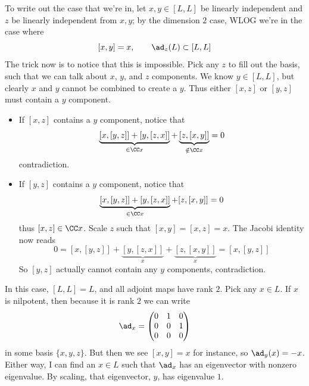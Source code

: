 \documentclass[11pt, headheight=30pt]{scrartcl}
\begin{document}
To write out the case that we're in, let $x,y \in [L,L]$ be linearly independent
and $z$ be linearly independent from $x,y$; by the dimension $2$ case,
WLOG we're in the case where
\[
    [x,y] = x, \qquad \ad_z(L) \subset [L,L]
\]
The trick now is to notice that this is impossible. Pick any $z$ to fill out
the basis, such that we can talk about $x$, $y$, and $z$ components.
We know $y\in [L,L]$, but clearly $x$ and $y$ cannot be
combined to create a $y$. Thus either $[x,z]$ or $[y,z]$ must contain
a $y$ component.
\begin{itemize}
    \item If $[x,z]$ contains a $y$ component, notice that
    \[
        \underbrace{[x, [y,z]] + [y, [z,x]]}_{\in \CC x} + \underbrace{[z, [x,y]]}_{\notin \CC x} = 0
    \]
    contradiction.
    \item If $[y,z]$ contains a $y$ component, notice that
    \[
        \underbrace{[x,[y,z]] + [y, [z,x]]}_{\in \CC x} + [z, [x,y]] = 0
    \]
    thus $[x,z]\in \CC x$. Scale $z$ such that $[x,y] = [x,z] = x$.
    The Jacobi identity now reads
    \[
        0 = [x, [y,z]] + \underbrace{[y, [z,x]]}_x + \underbrace{[z, [x,y]]}_x = [x, [y,z]]  
    \]
    So $[y,z]$ actually cannot contain any $y$ components, contradiction.
\end{itemize}


\begin{rcase*}
\end{rcase*}

In this case, $[L,L] = L$, and all adjoint maps
have rank $2$. Pick any $x\in L$. If $x$ is nilpotent,
then because it is rank $2$ we can write
\[
    \ad_x = \begin{pmatrix}
        0 & 1 & 0 \\
        0 & 0 & 1 \\
        0 & 0 & 0
    \end{pmatrix}    
\]
in some basis $\{x,y,z\}$. But then we see $[x,y] = x$
for instance, so $\ad_y(x) = -x$. Either way, I can
find an $x\in L$ such that $\ad_x$ has an eigenvector
with nonzero eigenvalue. By scaling, that eigenvector, $y$,
has eigenvalue $1$.
\end{document}
